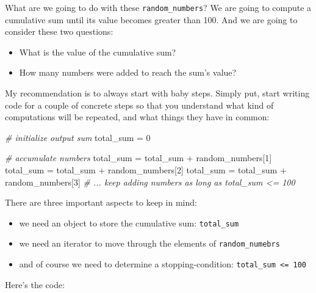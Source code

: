 \documentclass[
]{book}
\newenvironment{Shaded}{\begin{snugshade}}{\end{snugshade}}
\newcommand{\CommentTok}[1]{\textcolor[rgb]{0.56,0.35,0.01}{\textit{#1}}}
\newcommand{\DecValTok}[1]{\textcolor[rgb]{0.00,0.00,0.81}{#1}}
\newcommand{\NormalTok}[1]{#1}
\newcommand{\OtherTok}[1]{\textcolor[rgb]{0.56,0.35,0.01}{#1}}
\newcommand{\SpecialCharTok}[1]{\textcolor[rgb]{0.00,0.00,0.00}{#1}}
\begin{document}
What are we going to do with these \texttt{random\_numbers}? We are going to compute
a cumulative sum until its value becomes greater than 100. And we are going
to consider these two questions:

\begin{itemize}
\item
  What is the value of the cumulative sum?
\item
  How many numbers were added to reach the sum's value?
\end{itemize}

My recommendation is to always start with baby steps. Simply put, start writing
code for a couple of concrete steps so that you understand what kind of
computations will be repeated, and what things they have in common:

\begin{Shaded}
\begin{Highlighting}[]
\CommentTok{\# initialize output sum}
\NormalTok{total\_sum }\OtherTok{=} \DecValTok{0}

\CommentTok{\# accumulate numbers}
\NormalTok{total\_sum }\OtherTok{=}\NormalTok{ total\_sum }\SpecialCharTok{+}\NormalTok{ random\_numbers[}\DecValTok{1}\NormalTok{]}
\NormalTok{total\_sum }\OtherTok{=}\NormalTok{ total\_sum }\SpecialCharTok{+}\NormalTok{ random\_numbers[}\DecValTok{2}\NormalTok{]}
\NormalTok{total\_sum }\OtherTok{=}\NormalTok{ total\_sum }\SpecialCharTok{+}\NormalTok{ random\_numbers[}\DecValTok{3}\NormalTok{]}
\CommentTok{\# ... keep adding numbers as long as total\_sum \textless{}= 100}
\end{Highlighting}
\end{Shaded}

There are three important aspects to keep in mind:

\begin{itemize}
\item
  we need an object to store the cumulative sum: \texttt{total\_sum}
\item
  we need an iterator to move through the elements of \texttt{random\_numebrs}
\item
  and of course we need to determine a stopping-condition: \texttt{total\_sum\ \textless{}=\ 100}
\end{itemize}

Here's the code:
\end{document}
